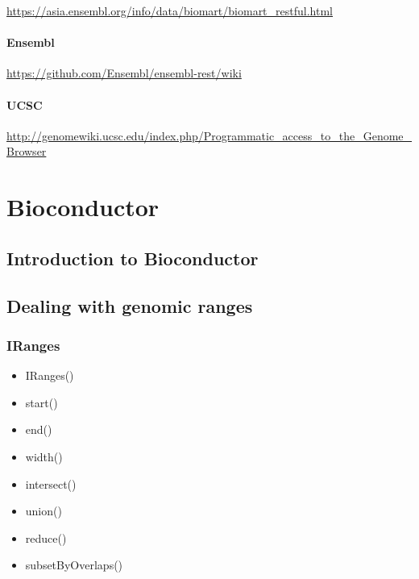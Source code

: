 \documentclass[]{book}
\providecommand{\tightlist}{%
  \setlength{\itemsep}{0pt}\setlength{\parskip}{0pt}}
\begin{document}
\url{https://asia.ensembl.org/info/data/biomart/biomart_restful.html}

\hypertarget{ensembl}{%
\subsubsection{Ensembl}\label{ensembl}}

\url{https://github.com/Ensembl/ensembl-rest/wiki}

\hypertarget{ucsc}{%
\subsubsection{UCSC}\label{ucsc}}

\url{http://genomewiki.ucsc.edu/index.php/Programmatic_access_to_the_Genome_Browser}

\hypertarget{bioconductor}{%
\chapter{Bioconductor}\label{bioconductor}}

\hypertarget{introduction-to-bioconductor}{%
\section{Introduction to
Bioconductor}\label{introduction-to-bioconductor}}

\hypertarget{dealing-with-genomic-ranges}{%
\section{Dealing with genomic
ranges}\label{dealing-with-genomic-ranges}}

\hypertarget{iranges}{%
\subsection{IRanges}\label{iranges}}

\begin{itemize}
\tightlist
\item
  IRanges()
\item
  start()
\item
  end()
\item
  width()
\item
  intersect()
\item
  union()
\item
  reduce()
\item
  subsetByOverlaps()
\end{itemize}
\end{document}
